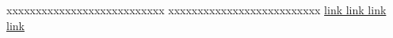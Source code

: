 \documentclass[a4paper]{article}
\begin{document}
\vspace*{48\baselineskip}
xxxxxxxxxxxxxxxxxxxxxxxxxxx xxxxxxxxxxxxxxxxxxxxxxxxxx
\href{xxxxx}{link link link link }
\end{document}
